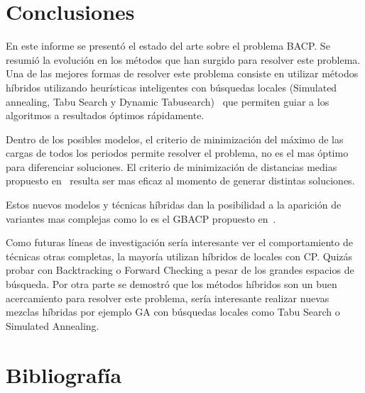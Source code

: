 \documentclass[letterpaper,10pt]{article}
\begin{document}
\section{Conclusiones}
En este informe se presentó el estado del arte sobre el problema BACP. Se resumió la evolución en los métodos que han surgido para resolver este problema. Una de las mejores formas de resolver este problema consiste en utilizar métodos híbridos utilizando heurísticas inteligentes con búsquedas locales (Simulated annealing, Tabu Search y Dynamic Tabusearch)~\cite{GbacpGaspero} que permiten guiar a los algoritmos a resultados óptimos rápidamente.

Dentro de los posibles modelos, el criterio de minimización del máximo de las cargas de todos los periodos permite resolver el problema, no es el mas óptimo para diferenciar soluciones. El criterio de minimización de distancias medias propuesto en~\cite{Monette07acp} resulta ser mas eficaz al momento de generar distintas soluciones.

Estos nuevos modelos y técnicas híbridas dan la posibilidad a la aparición de variantes mas complejas como lo es el GBACP propuesto en~\cite{GbacpGaspero,balac}.

Como futuras líneas de investigación sería interesante ver el comportamiento de técnicas otras completas, la mayoría utilizan híbridos de locales con CP. Quizás probar con Backtracking  o Forward Checking a pesar de los grandes espacios de búsqueda. Por otra parte se demostró que los métodos híbridos son un buen acercamiento para resolver este problema, sería interesante realizar nuevas mezclas híbridas por ejemplo GA con búsquedas locales como Tabu Search o Simulated Annealing.
\section{Bibliografía}


\end{document}
